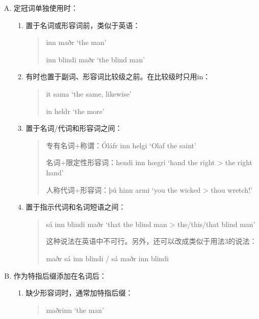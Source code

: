 \begin{enumerate}[A.]
    \item 定冠词单独使用时：
    \begin{enumerate}[1)]
        \item 置于名词或形容词前，类似于英语：
        \begin{quote}
            inn maðr `the man'
          
            inn blindi maðr `the blind man'
          \end{quote}

        \item 有时也置于副词、形容词比较级之前。在比较级时只用in：
        \begin{quote}
            it sama `the same, likewise'
          
            in heldr `the more'
          \end{quote}
        
        \item 置于名词/代词和形容词之间：
        \begin{quote}
            专有名词+称谓：Óláfr inn helgi `Olaf the saint'
          
            名词+限定性形容词：hendi inn hœgri `hand the right \textgreater{} the
            right hand'
          
            人称代词+形容词：þú hinn armi `you the wicked \textgreater{} thou
            wretch!'
          \end{quote}

        \item 置于指示代词和名词短语之间：
        \begin{quote}
            sá inn blindi maðr `that the blind man \textgreater{} the/this/that
            blind man'
          
            这种说法在英语中不可行。另外，还可以改成类似于用法3的说法：
          
            maðr sá inn blindi / sá maðr inn blindi
          \end{quote}

    \end{enumerate}

    \item 作为特指后缀添加在名词后：
    \begin{enumerate}[1)]
        \item 缺少形容词时，通常加特指后缀：
        \begin{quote}
            maðrinn `the man'
          \end{quote}


\end{enumerate}
\end{enumerate}
